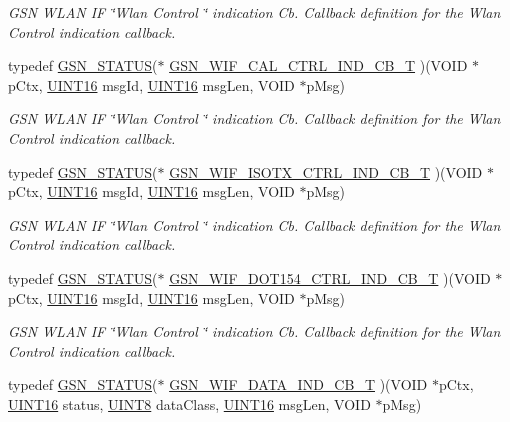 \begin{DoxyCompactItemize}
\begin{DoxyCompactList}\small\item\em GSN WLAN IF \char`\"{}Wlan Control \char`\"{} indication Cb. Callback definition for the Wlan Control indication callback. \end{DoxyCompactList}\item 
typedef \hyperlink{a00660_gada5951904ac6110b1fa95e51a9ddc217}{GSN\_\-STATUS}($\ast$ \hyperlink{a00635_ga713dea098107eba190695d6e868ff027}{GSN\_\-WIF\_\-CAL\_\-CTRL\_\-IND\_\-CB\_\-T} )(VOID $\ast$pCtx, \hyperlink{a00660_ga09f1a1fb2293e33483cc8d44aefb1eb1}{UINT16} msgId, \hyperlink{a00660_ga09f1a1fb2293e33483cc8d44aefb1eb1}{UINT16} msgLen, VOID $\ast$pMsg)
\begin{DoxyCompactList}\small\item\em GSN WLAN IF \char`\"{}Wlan Control \char`\"{} indication Cb. Callback definition for the Wlan Control indication callback. \end{DoxyCompactList}\item 
typedef \hyperlink{a00660_gada5951904ac6110b1fa95e51a9ddc217}{GSN\_\-STATUS}($\ast$ \hyperlink{a00635_gac721992ff2f8c904a29e80d4b2eaead3}{GSN\_\-WIF\_\-ISOTX\_\-CTRL\_\-IND\_\-CB\_\-T} )(VOID $\ast$pCtx, \hyperlink{a00660_ga09f1a1fb2293e33483cc8d44aefb1eb1}{UINT16} msgId, \hyperlink{a00660_ga09f1a1fb2293e33483cc8d44aefb1eb1}{UINT16} msgLen, VOID $\ast$pMsg)
\begin{DoxyCompactList}\small\item\em GSN WLAN IF \char`\"{}Wlan Control \char`\"{} indication Cb. Callback definition for the Wlan Control indication callback. \end{DoxyCompactList}\item 
typedef \hyperlink{a00660_gada5951904ac6110b1fa95e51a9ddc217}{GSN\_\-STATUS}($\ast$ \hyperlink{a00635_gaf83e1299bf211f7c06ff40e18f1d3ad4}{GSN\_\-WIF\_\-DOT154\_\-CTRL\_\-IND\_\-CB\_\-T} )(VOID $\ast$pCtx, \hyperlink{a00660_ga09f1a1fb2293e33483cc8d44aefb1eb1}{UINT16} msgId, \hyperlink{a00660_ga09f1a1fb2293e33483cc8d44aefb1eb1}{UINT16} msgLen, VOID $\ast$pMsg)
\begin{DoxyCompactList}\small\item\em GSN WLAN IF \char`\"{}Wlan Control \char`\"{} indication Cb. Callback definition for the Wlan Control indication callback. \end{DoxyCompactList}\item 
typedef \hyperlink{a00660_gada5951904ac6110b1fa95e51a9ddc217}{GSN\_\-STATUS}($\ast$ \hyperlink{a00635_gad46de129691b078bd6ff8df7f46318d2}{GSN\_\-WIF\_\-DATA\_\-IND\_\-CB\_\-T} )(VOID $\ast$pCtx, \hyperlink{a00660_ga09f1a1fb2293e33483cc8d44aefb1eb1}{UINT16} status, \hyperlink{a00660_gab27e9918b538ce9d8ca692479b375b6a}{UINT8} dataClass, \hyperlink{a00660_ga09f1a1fb2293e33483cc8d44aefb1eb1}{UINT16} msgLen, VOID $\ast$pMsg)

\end{DoxyCompactItemize}
